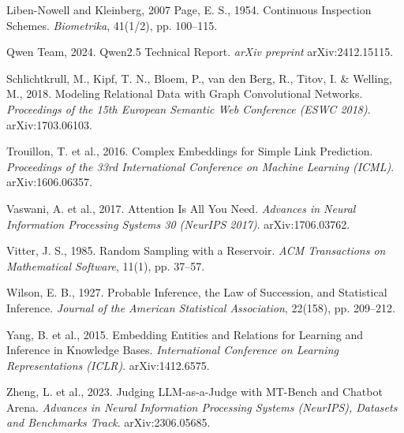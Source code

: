 \documentclass[a4paper,12pt]{report}
\begin{document}
\begin{thebibliography}{Liben-Nowell and Kleinberg, 2007}
Page, E. S., 1954. Continuous Inspection Schemes. {\em Biometrika}, 41(1/2),
pp. 100--115.

Qwen Team, 2024. Qwen2.5 Technical Report. {\em arXiv preprint} arXiv:2412.15115.

Schlichtkrull, M., Kipf, T. N., Bloem, P., van den Berg, R., Titov, I. \&
Welling, M., 2018. Modeling Relational Data with Graph Convolutional
Networks. {\em Proceedings of the 15th European Semantic Web Conference
(ESWC 2018)}. arXiv:1703.06103.

Trouillon, T. et al., 2016. Complex Embeddings for Simple Link Prediction. {\em
Proceedings of the 33rd International Conference on Machine Learning (ICML)}.
arXiv:1606.06357.

Vaswani, A. et al., 2017. Attention Is All You Need. {\em Advances in Neural
Information Processing Systems 30 (NeurIPS 2017)}. arXiv:1706.03762.

Vitter, J. S., 1985. Random Sampling with a Reservoir. {\em ACM Transactions on
Mathematical Software}, 11(1), pp. 37--57.

Wilson, E. B., 1927. Probable Inference, the Law of Succession, and
Statistical Inference. {\em Journal of the American Statistical Association},
22(158), pp. 209--212.

Yang, B. et al., 2015. Embedding Entities and Relations for Learning and
Inference in Knowledge Bases. {\em International Conference on Learning
Representations (ICLR)}. arXiv:1412.6575.

Zheng, L. et al., 2023. Judging LLM-as-a-Judge with MT-Bench and Chatbot
Arena. {\em Advances in Neural Information Processing Systems (NeurIPS),
Datasets and Benchmarks Track}. arXiv:2306.05685.

\end{thebibliography}

\appendix
\end{document}
